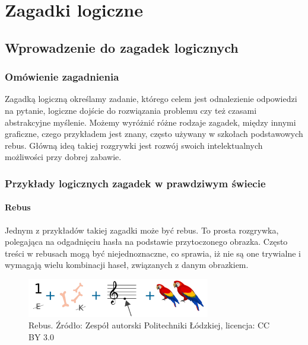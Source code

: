 \documentclass[oneside,polski,logo]{amuthesis}
\begin{document}
\chapter{Zagadki logiczne}
\section{Wprowadzenie do zagadek logicznych}
\subsection{Omówienie zagadnienia}
\par Zagadką logiczną określamy zadanie, którego celem jest odnalezienie odpowiedzi na pytanie, logiczne dojście do rozwiązania problemu czy też czasami abstrakcyjne myślenie. Możemy wyróżnić różne rodzaje zagadek, między innymi graficzne, czego przykładem jest znany, często używany w szkołach podstawowych rebus. Główną ideą takiej rozgrywki jest rozwój swoich intelektualnych możliwości przy dobrej zabawie. \cite{zagadka_logiczna}
\subsection{Przykłady logicznych zagadek w prawdziwym świecie}
\subsubsection{Rebus}
\par Jednym z przykładów takiej zagadki może być rebus. To prosta rozgrywka, polegająca na odgadnięciu hasła na podstawie przytoczonego obrazka. Często treści w rebusach mogą być niejednoznaczne, co sprawia, iż nie są one trywialne i wymagają wielu kombinacji haseł, związanych z danym obrazkiem. \cite{rebus}
\begin{figure}[h]
	\centering
	\includegraphics[width=8cm]{images/tyrek/rebus.png}
	\caption{Rebus. Źródło: Zespół autorski Politechniki Łódzkiej, licencja: CC BY 3.0}
\end{figure}
\end{document}
